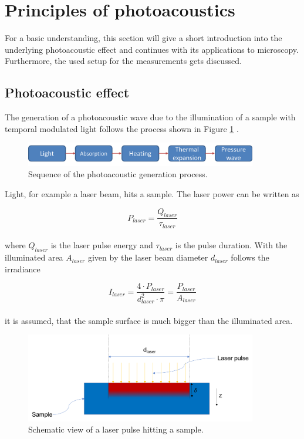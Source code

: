 \section{Principles of photoacoustics}

For a basic understanding, this section will give a short introduction into the underlying photoacoustic effect and continues with its applications to microscopy. Furthermore, the used setup for the measurements gets discussed.

\subsection{Photoacoustic effect}
\label{sec:photoeffect}
The generation of a photoacoustic wave due to the illumination of a sample with temporal modulated light follows the process shown in Figure \ref{fig:PAgen} \cite{Wang:PAMtutorial}. 

\begin{figure}[H]
	\centering
	\includegraphics[width = 0.9\textwidth]{02_principles_of_photoacoustics/images/photoacousticGeneration.png}
	\caption{Sequence of the photoacoustic generation process.}
	\label{fig:PAgen}
\end{figure}

Light, for example a laser beam, hits a sample. The laser power can be written as

\begin{equation}
	P_{laser} = \frac{Q_{laser}}{\tau_{laser}}
	\label{eq:LP}
\end{equation}
\\
where $Q_{laser}$ is the laser pulse energy and $\tau_{laser}$ is the pulse duration. With the illuminated area $A_{laser}$ given by the laser beam diameter $d_{laser}$ follows the irradiance 

\begin{equation}
I_{laser} = \frac{4 \cdot P_{laser}}{d_{laser}^2 \cdot \pi} = \frac{P_{laser}}{A_{laser}}
\label{eq:ILaser}
\end{equation}
\\
it is assumed, that the sample surface is much bigger than the illuminated area. 

\begin{figure}[H]
	\centering
	\includegraphics[width = 0.9\textwidth]{02_principles_of_photoacoustics/images/lpOnSample.png}
	\caption{Schematic view of a laser pulse hitting a sample.}
	\label{fig:LPonSample}
\end{figure}

